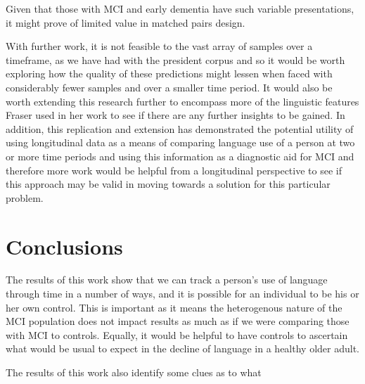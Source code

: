 \documentclass[12pt]{article}
\begin{document}
Given that those with MCI and early dementia have such variable presentations, it might prove of limited value in matched pairs design. 
\par 
With further work, it is not feasible to the vast array of samples over a timeframe, as we have had with the president corpus and so it would be worth exploring how the quality of these predictions might lessen when faced with considerably fewer samples and over a smaller time period. It would also be worth extending this research further to encompass more of the linguistic features Fraser used in her work \cite{Fraser2015} to see if there are any further insights to be gained. In addition, this replication and extension has demonstrated the potential utility of using longitudinal data as a means of comparing language use of a person at two or more time periods and using this information as a diagnostic aid for MCI and therefore more work would be helpful from a longitudinal perspective to see if this approach may be valid in moving towards a solution for this particular problem. 

\section{Conclusions}\label{conclusions}
The results of this work show that we can track a person's use of language through time in a number of ways, and it is possible for an individual to be his or her own control. This is important as it means the heterogenous nature of the MCI population does not impact results as much as if we were comparing those with MCI to controls. Equally, it would be helpful to have controls to ascertain what would be usual to expect in the decline of language in a healthy older adult. 
\par 
The results of this work also identify some clues as to what



\end{document}
